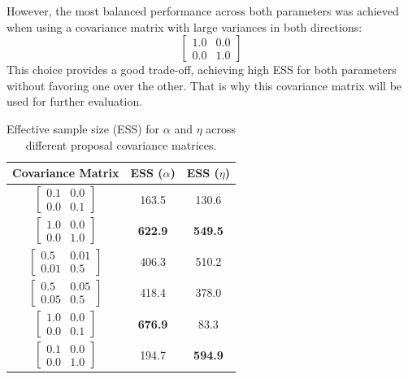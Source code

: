 \documentclass[9pt]{IEEEtran}
\begin{document}
However, the most balanced performance across both parameters was achieved when using a covariance matrix with large variances in both directions:
\[
\begin{bmatrix}
1.0 & 0.0 \\
0.0 & 1.0
\end{bmatrix}
\]
This choice provides a good trade-off, achieving high ESS for both parameters without favoring one over the other.
That is why this covariance matrix will be used for further evaluation. 

\begin{table}[H]
\centering
\renewcommand{\arraystretch}{1.4}
\begin{tabular}{c|c|c}

\textbf{Covariance Matrix} & \textbf{ESS ($\alpha$)} & \textbf{ESS ($\eta$)} \\
\hline
$\begin{bmatrix} 0.1 & 0.0 \\ 0.0 & 0.1 \end{bmatrix}$ & 163.5 & 130.6 \\
$\begin{bmatrix} 1.0 & 0.0 \\ 0.0 & 1.0 \end{bmatrix}$ & \textbf{622.9} & \textbf{549.5} \\
$\begin{bmatrix} 0.5 & 0.01 \\ 0.01 & 0.5 \end{bmatrix}$ & 406.3 & 510.2 \\
$\begin{bmatrix} 0.5 & 0.05 \\ 0.05 & 0.5 \end{bmatrix}$ & 418.4 & 378.0 \\
$\begin{bmatrix} 1.0 & 0.0 \\ 0.0 & 0.1 \end{bmatrix}$ & \textbf{676.9} & 83.3 \\
$\begin{bmatrix} 0.1 & 0.0 \\ 0.0 & 1.0 \end{bmatrix}$ & 194.7 & \textbf{594.9} \\

\end{tabular}
\caption{Effective sample size (ESS) for $\alpha$ and $\eta$ across different proposal covariance matrices.}
\label{tab:ess_covariances}
\end{table}
\end{document}
